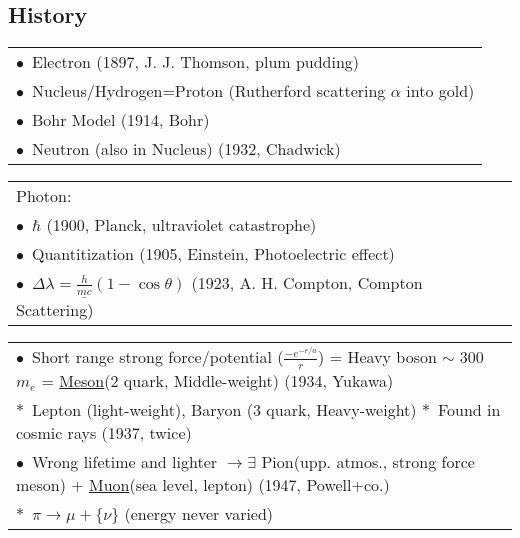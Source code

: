 \documentclass{article}
\begin{document}
\parindent=0pt

\begin{landscape}

\subsection{History}

\begin{tabular}[t]{l}
    \(\bullet\)\ Electron (1897, J. J. Thomson, plum pudding)\\
    \(\bullet\)\ Nucleus/Hydrogen=Proton (Rutherford scattering \(\alpha\) into gold)\\
    \(\bullet\)\ Bohr Model (1914, Bohr)\\
    \(\bullet\)\ Neutron (also in Nucleus) (1932, Chadwick)
\end{tabular}
\hspace{20pt}
\begin{tabular}[t]{l}
    Photon:\\
    \(\bullet\)\ \(\hbar\) (1900, Planck, ultraviolet catastrophe)\\
    \(\bullet\)\ Quantitization (1905, Einstein, Photoelectric effect)\\
    \(\bullet\)\ \( \Delta\lambda = \underline{\tfrac{h}{mc}}(1-\cos\theta) \) (1923, A. H. Compton, Compton Scattering)\\
\end{tabular}

\vspace{15pt}
\begin{tabular}[t]{l}
    \(\bullet\)\ Short range strong force/potential (\(\tfrac{-e^{-r/a}}{r}\)) = Heavy boson \(\sim\) 300\(m_e\) %
        = \underline{Meson}(2 quark, Middle-weight) (1934, Yukawa)
        \\
    \(\ast\)\ Lepton (light-weight), Baryon (3 quark, Heavy-weight) \hspace{15pt} \(\ast\)\ Found in cosmic rays (1937, twice)\\
    \(\bullet\)\ Wrong lifetime and lighter \(\rightarrow \exists\) Pion(upp. atmos., strong force meson) + %
        \underline{Muon}(sea level, lepton) (1947, Powell+co.)
        \\
    \(\ast\)\ \(\pi \rightarrow \mu + \{\nu\}\) (energy never varied)
\end{tabular}


\end{landscape}
\end{document}
